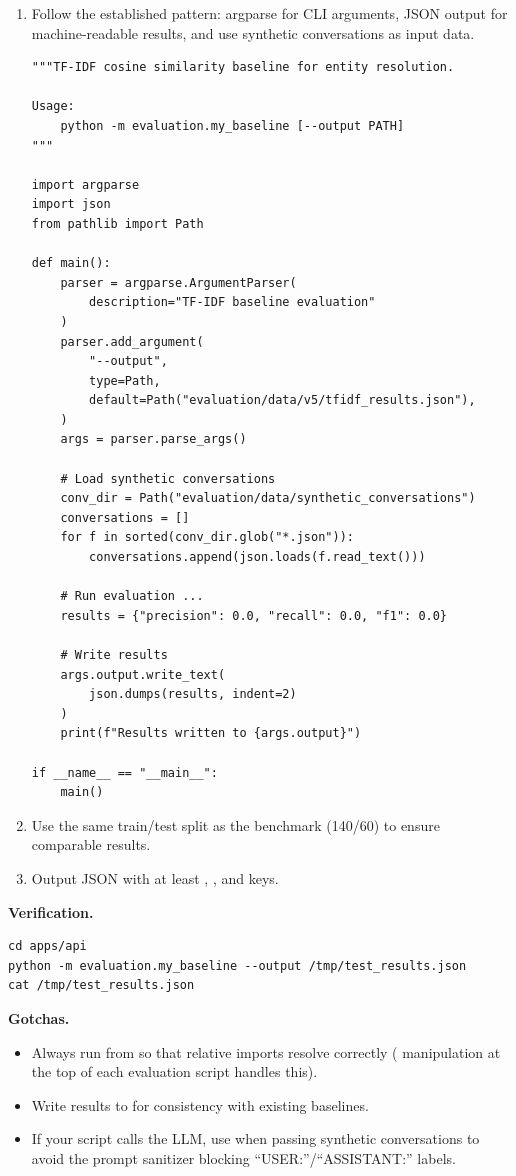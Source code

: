 \begin{enumerate}
    \item Follow the established pattern: argparse for CLI arguments, JSON
          output for machine-readable results, and use synthetic
          conversations as input data.

\begin{lstlisting}[style=python, title=evaluation/my\_baseline.py]
"""TF-IDF cosine similarity baseline for entity resolution.

Usage:
    python -m evaluation.my_baseline [--output PATH]
"""

import argparse
import json
from pathlib import Path

def main():
    parser = argparse.ArgumentParser(
        description="TF-IDF baseline evaluation"
    )
    parser.add_argument(
        "--output",
        type=Path,
        default=Path("evaluation/data/v5/tfidf_results.json"),
    )
    args = parser.parse_args()

    # Load synthetic conversations
    conv_dir = Path("evaluation/data/synthetic_conversations")
    conversations = []
    for f in sorted(conv_dir.glob("*.json")):
        conversations.append(json.loads(f.read_text()))

    # Run evaluation ...
    results = {"precision": 0.0, "recall": 0.0, "f1": 0.0}

    # Write results
    args.output.write_text(
        json.dumps(results, indent=2)
    )
    print(f"Results written to {args.output}")

if __name__ == "__main__":
    main()
\end{lstlisting}

    \item Use the same train/test split as the benchmark (140/60) to ensure
          comparable results.
    \item Output JSON with at least , , and
           keys.
\end{enumerate}

\medskip\noindent\textbf{Verification.}

\begin{lstlisting}[style=bash, numbers=none]
cd apps/api
python -m evaluation.my_baseline --output /tmp/test_results.json
cat /tmp/test_results.json
\end{lstlisting}

\medskip\noindent\textbf{Gotchas.}

\begin{itemize}
    \item Always run from  so that relative imports
          resolve correctly ( manipulation at the top of each
          evaluation script handles this).
    \item Write results to  for consistency
          with existing baselines.
    \item If your script calls the LLM, use
           when passing synthetic conversations
          to avoid the prompt sanitizer blocking ``USER:''/``ASSISTANT:''
          labels.
\end{itemize}


